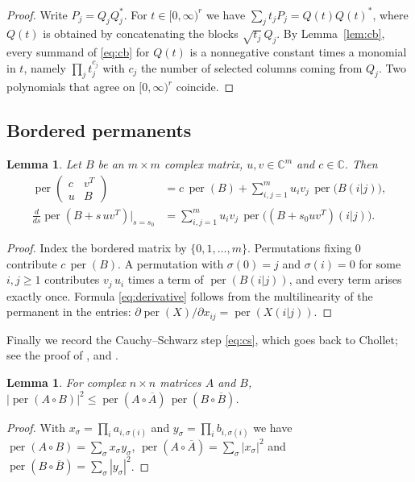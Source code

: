 \documentclass[11pt]{amsart}
\newtheorem{lemma}[theorem]{Lemma}
\theoremstyle{remark}
\numberwithin{equation}{section}
\newcommand{\per}{\operatorname{per}}
\newcommand{\C}{\mathbb{C}}
\newcommand{\conj}[1]{\overline{#1}}
\begin{document}
\begin{proof}
Write $P_j=Q_jQ_j^*$. For $t\in[0,\infty)^r$ we have $\sum_jt_jP_j=Q(t)Q(t)^*$, where $Q(t)$ is obtained by concatenating the blocks $\sqrt{t_j}\,Q_j$. By Lemma~\ref{lem:cb}, every summand of \eqref{eq:cb} for $Q(t)$ is a nonnegative constant times a monomial in $t$, namely $\prod_jt_j^{c_j}$ with $c_j$ the number of selected columns coming from $Q_j$. Two polynomials that agree on $[0,\infty)^r$ coincide.
\end{proof}

\subsection{Bordered permanents}

\begin{lemma}\label{lem:bordergeneral}
Let $B$ be an $m\times m$ complex matrix, $u,v\in\C^m$ and $c\in\C$. Then
\begin{align}
\per\begin{pmatrix}c&v^T\\ u&B\end{pmatrix}&=c\,\per(B)+\sum_{i,j=1}^mu_iv_j\,\per\bigl(B(i|j)\bigr),\label{eq:bordergen}\\
\frac{d}{ds}\per(B+s\,uv^T)\Big|_{s=s_0}&=\sum_{i,j=1}^mu_iv_j\,\per\bigl((B+s_0uv^T)(i|j)\bigr).\label{eq:derivative}
\end{align}
\end{lemma}

\begin{proof}
Index the bordered matrix by $\{0,1,\dots,m\}$. Permutations fixing $0$ contribute $c\,\per(B)$. A permutation with $\sigma(0)=j$ and $\sigma(i)=0$ for some $i,j\ge1$ contributes $v_j\,u_i$ times a term of $\per(B(i|j))$, and every term arises exactly once. Formula \eqref{eq:derivative} follows from the multilinearity of the permanent in the entries: $\partial\per(X)/\partial x_{ij}=\per(X(i|j))$.
\end{proof}

Finally we record the Cauchy--Schwarz step \eqref{eq:cs}, which goes back to Chollet; see the proof of \cite[Lemma~2.2]{Bea}, \cite[Lemma~2]{PS} and \cite[Lemma~2.1]{Ma}.

\begin{lemma}\label{lem:cs}
For complex $n\times n$ matrices $A$ and $B$, $|\per(A\circ B)|^2\le\per(A\circ\conj{A})\,\per(B\circ\conj{B})$.
\end{lemma}

\begin{proof}
With $x_\sigma=\prod_ia_{i,\sigma(i)}$ and $y_\sigma=\prod_ib_{i,\sigma(i)}$ we have $\per(A\circ B)=\sum_\sigma x_\sigma y_\sigma$, $\per(A\circ\conj{A})=\sum_\sigma|x_\sigma|^2$ and $\per(B\circ\conj{B})=\sum_\sigma|y_\sigma|^2$.
\end{proof}
\end{document}
